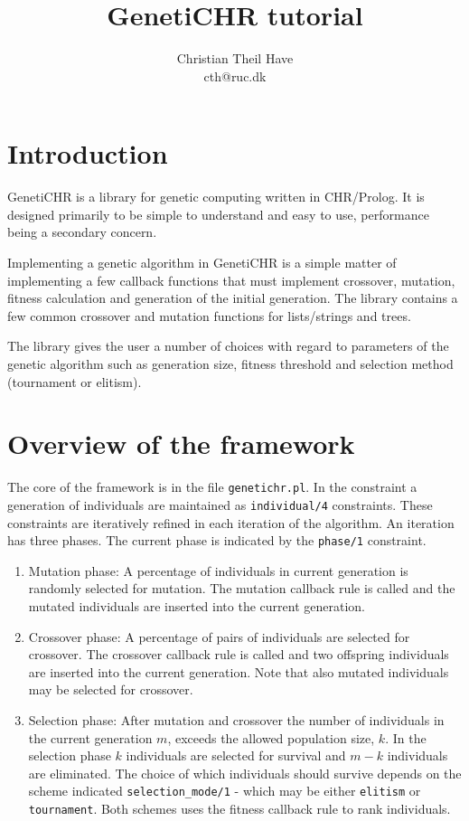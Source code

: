 \documentclass{article}
\title{GenetiCHR tutorial}
\author{Christian Theil Have\\ cth@ruc.dk}
\begin{document}
\maketitle

\section{Introduction}

GenetiCHR is a library for genetic computing written in CHR/Prolog. It is designed primarily to be simple to understand and easy to use, performance being a secondary concern. 

Implementing a genetic algorithm in GenetiCHR is a simple matter of implementing a few callback functions that must implement crossover, mutation, fitness calculation
and generation of the initial generation. The library contains a few common crossover and mutation functions for lists/strings and trees.

The library gives the user a number of choices with regard to parameters of the genetic algorithm such as generation size, fitness threshold and selection method (tournament or elitism).

\section{Overview of the framework}

The core of the framework is in the file \verb|genetichr.pl|. In the constraint a generation of individuals are maintained as \verb|individual/4| constraints. These constraints are iteratively refined
in each iteration of the algorithm. An iteration has three phases. The current phase is indicated by the \verb|phase/1| constraint.

\begin{enumerate}
\item Mutation phase: A percentage of individuals in current generation is randomly selected for mutation. The mutation callback rule is called and the mutated individuals are inserted into the current generation.
\item Crossover phase:  A percentage of pairs of individuals are selected for crossover. The crossover callback rule is called and two offspring individuals are inserted into the current generation. Note that also mutated individuals may be selected for crossover.
\item Selection phase: After mutation and crossover the number of individuals in the current generation $m$, exceeds the allowed population size, $k$. In the selection phase $k$ individuals are selected for survival and $m-k$ individuals are eliminated. The choice of which individuals should survive depends on the scheme indicated \verb|selection_mode/1| - which may be either \verb|elitism| or \verb|tournament|. Both schemes uses the fitness callback rule to rank individuals.
\end{enumerate}
\end{document}
